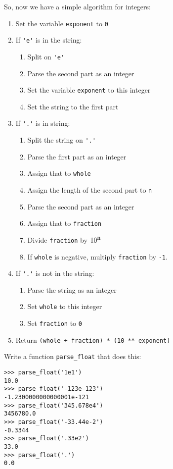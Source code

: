 \documentclass[12pt]{article}
\begin{document}
\begin{description}
So, now we have a simple algorithm for integers:
\begin{enumerate}
\item Set the variable \lstinline{exponent} to \lstinline{0}
\item If \lstinline{'e'} is in the string:
\begin{enumerate}
\item Split on \lstinline{'e'}
\item Parse the second part as an integer
\item Set the variable \lstinline{exponent} to this integer
\item Set the string to the first part
\end{enumerate}
\item If \lstinline{'.'} is in string:
\begin{enumerate}
\item Split the string on \lstinline{'.'}
\item Parse the first part as an integer
\item Assign that to \lstinline{whole}
\item Assign the length of the second part to \lstinline{n}
\item Parse the second part as an integer
\item Assign that to \lstinline{fraction}
\item Divide \lstinline{fraction} by $10^{\mbox{\tt n}}$
\item If \lstinline{whole} is negative, multiply \lstinline{fraction} by
\lstinline{-1}.
\end{enumerate}
\item If \lstinline{'.'} is not in the string:
\begin{enumerate}
\item Parse the string as an integer
\item Set \lstinline{whole} to this integer
\item Set \lstinline{fraction} to \lstinline{0}
\end{enumerate}
\item Return \lstinline{(whole + fraction) * (10 ** exponent)}
\end{enumerate}

Write a function \lstinline{parse_float} that does this:
\begin{lstlisting}
>>> parse_float('1e1')
10.0
>>> parse_float('-123e-123')
-1.2300000000000001e-121
>>> parse_float('345.678e4')
3456780.0
>>> parse_float('-33.44e-2')
-0.3344
>>> parse_float('.33e2')
33.0
>>> parse_float('.')
0.0
\end{lstlisting}


\end{description}
\end{document}
